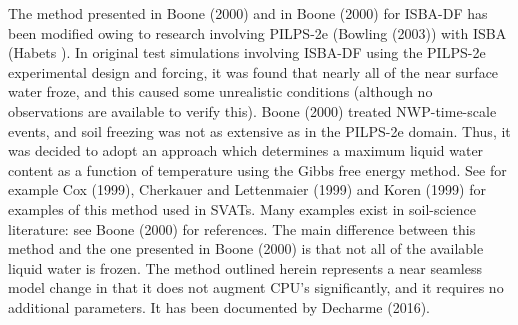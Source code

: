 The method presented in Boone \etal (2000) and in Boone (2000)
for ISBA-DF has been modified owing to research involving
PILPS-2e (Bowling \etal (2003)\nocite{Bowling2003}) with
ISBA (Habets ). In original test
simulations involving ISBA-DF using the PILPS-2e experimental design
and forcing, it was found that nearly all of the near surface
water froze, and this caused some unrealistic conditions
(although no observations are available to verify this).
Boone \etal (2000) treated NWP-time-scale events, and soil
freezing was not as extensive as in the PILPS-2e domain.
Thus, it was decided to adopt an approach which 
determines a maximum liquid water content as a function
of temperature using the Gibbs free energy method.
See for example Cox \etal (1999)\nocite{Cox1999},
Cherkauer and Lettenmaier (1999)\nocite{Cherkauer1999}
and Koren \etal (1999)\nocite{Koren1999}
for examples of this method used in SVATs. Many examples exist
in soil-science literature: see Boone (2000) for references.
The main difference between this method and the one presented
in Boone \etal (2000) is that 
not all of the available liquid water is frozen.
The method outlined herein represents a near seamless model
change in that it does not augment CPU's significantly,
and it requires no additional parameters.
It has been documented by Decharme \etal (2016).

